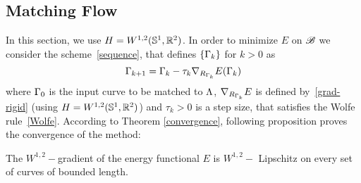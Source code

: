 \subsection{Matching Flow}
In this section, we use $H = W^{1,2}(\mathbb{S}^1,{\mathbb R}^2)$.
In order to minimize $E$ on $\mathcal{B}$ we consider the scheme~\eqref{sequence}, that defines $\{\Gamma_k\}$ for $k>0$ as 
\begin{equation}\label{descent}
	\Gamma_{k+1} = \Gamma_k - \tau_k \nabla_{R_{\Gamma_k}} E(\Gamma_k ) 
\end{equation}
where $\Gamma_0$ is the input curve to be matched to $\Lambda$, 
 $\nabla_{R_{\Gamma_k}} E$ is defined by~\eqref{grad-rigid} (using $H = W^{1,2}(\mathbb{S}^1,{\mathbb R}^2)$) and  $\tau_k > 0$ is a step size, that satisfies the Wolfe rule~\eqref{Wolfe}. According to Theorem \ref{convergence}, following proposition proves the convergence of the method:


\begin{prop} 
The $W^{1,2}-$gradient of the energy functional $E$ is $W^{1,2}-$ Lipschitz on every set of curves of bounded length.
\end{prop}

